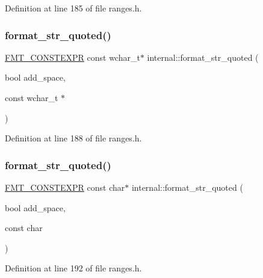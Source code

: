 Definition at line 185 of file ranges.\+h.

\mbox{\label{namespaceinternal_a4773ec73cdc3b39cffcdd4035bc5348f}} 
\subsubsection{\texorpdfstring{format\+\_\+str\+\_\+quoted()}{format\_str\_quoted()}\hspace{0.1cm}{\footnotesize\ttfamily [4/6]}}
{\footnotesize\ttfamily \hyperlink{core_8h_a69201cb276383873487bf68b4ef8b4cd}{F\+M\+T\+\_\+\+C\+O\+N\+S\+T\+E\+X\+PR} const wchar\+\_\+t$\ast$ internal\+::format\+\_\+str\+\_\+quoted (\begin{DoxyParamCaption}\item[{bool}]{add\+\_\+space,  }\item[{const wchar\+\_\+t $\ast$}]{ }\end{DoxyParamCaption})}



Definition at line 188 of file ranges.\+h.

\mbox{\label{namespaceinternal_a9ba8863a8d3f90fb4b02f679339ee868}} 
\subsubsection{\texorpdfstring{format\+\_\+str\+\_\+quoted()}{format\_str\_quoted()}\hspace{0.1cm}{\footnotesize\ttfamily [5/6]}}
{\footnotesize\ttfamily \hyperlink{core_8h_a69201cb276383873487bf68b4ef8b4cd}{F\+M\+T\+\_\+\+C\+O\+N\+S\+T\+E\+X\+PR} const char$\ast$ internal\+::format\+\_\+str\+\_\+quoted (\begin{DoxyParamCaption}\item[{bool}]{add\+\_\+space,  }\item[{const char}]{ }\end{DoxyParamCaption})}



Definition at line 192 of file ranges.\+h.

\mbox{\label{namespaceinternal_a058b7ff5306c068d78ebd905aa902886}} 
